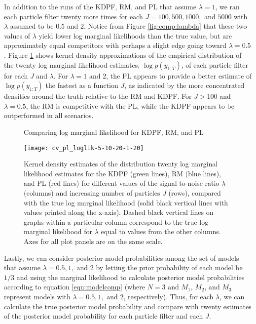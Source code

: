 In addition to the runs of the KDPF, RM, and PL that assume $\lambda = 1$, we ran each particle filter twenty more times for each $J = 100, 500, 1000, \mbox{ and } 5000$ with $\lambda$ assumed to be 0.5 and 2. Notice from Figure \ref{fig:comp:lambda} that these two values of $\lambda$ yield lower log marginal likelihoods than the true value, but are approximately equal competitors with perhaps a slight edge going toward $\lambda = 0.5$. Figure \ref{fig:comp:loglik} shows kernel density approximations of the empirical distribution of the twenty log marginal likelihood estimates, $\log p(y_{1:T})$, of each particle filter for each $J$ and $\lambda$. For $\lambda = 1 \mbox{ and } 2$, the PL appears to provide a better estimate of $\log p(y_{1:T})$ the fastest as a function $J$, as indicated by the more concentrated densities around the truth relative to the RM and KDPF. For $J > 100$ and $\lambda = 0.5$, the RM is competitive with the PL, while the KDPF appears to be outperformed in all scenarios.

\begin{figure}[ht]
\ssp
\centering
\caption{Comparing log marginal likelihood for KDPF, RM, and PL} \label{fig:comp:loglik}
\texttt{[image: cv\_pl\_loglik-5-10-20-1-20]}
\caption*{Kernel density estimates of the distribution twenty log marginal likelihood estimates for the KDPF (green lines), RM (blue lines), and PL (red lines) for different values of the signal-to-noise ratio $\lambda$ (columns) and increasing number of particles $J$ (rows), compared with the true log marginal likelihood (solid black vertical lines with values printed along the x-axis). Dashed black vertical lines on graphs within a particular column correspond to the true log marginal likelihood for $\lambda$ equal to values from the other columns. Axes for all plot panels are on the same scale.}
\end{figure}

Lastly, we can consider posterior model probabilities among the set of models that assume $\lambda = 0.5, 1, \mbox{ and } 2$ by letting the prior probability of each model be $1/3$ and using the marginal likelihood to calculate posterior model probabilities according to equation \eqref{eqn:modelcomp} (where $N = 3$ and $M_1$, $M_2$, and $M_3$ represent models with $\lambda = 0.5, 1, \mbox{ and } 2$, respectively). Thus, for each $\lambda$, we can calculate the true posterior model probability and compare with twenty estimates of the posterior model probability for each particle filter and each $J$.

